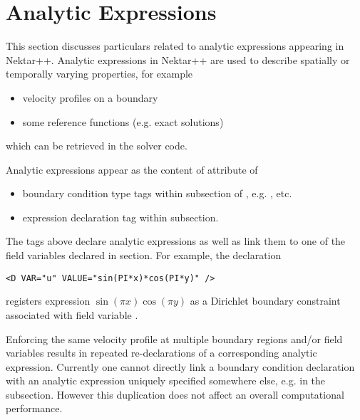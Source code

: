 \section{Analytic Expressions}
This section discusses particulars related to analytic expressions appearing in
Nektar++. Analytic expressions in Nektar++ are used to describe spatially or
temporally varying properties, for example
\begin{itemize}
\item velocity profiles on a boundary
\item some reference functions (e.g. exact solutions)
\end{itemize}
which can be retrieved in the solver code.

Analytic expressions appear as the content of  attribute of
\begin{itemize}
\item boundary condition type tags within  subsection of
 , e.g. ,  etc. 
\item expression declaration tag  within 
subsection.
\end{itemize}

The tags above declare analytic expressions as well as link them to one of the
field variables declared in  section. For example, the
declaration 
\begin{lstlisting}[style=XMLStyle]
  <D VAR="u" VALUE="sin(PI*x)*cos(PI*y)" />
\end{lstlisting}
registers expression $\sin(\pi x)\cos(\pi y)$ as a Dirichlet
boundary constraint associated with field variable .

Enforcing the same velocity profile at multiple boundary regions and/or field
variables results in repeated re-declarations of a corresponding analytic
expression. Currently one cannot directly link a boundary condition declaration
with an analytic expression uniquely specified somewhere else, e.g. in the
 subsection. However this duplication does not affect an
overall computational performance.

% 

